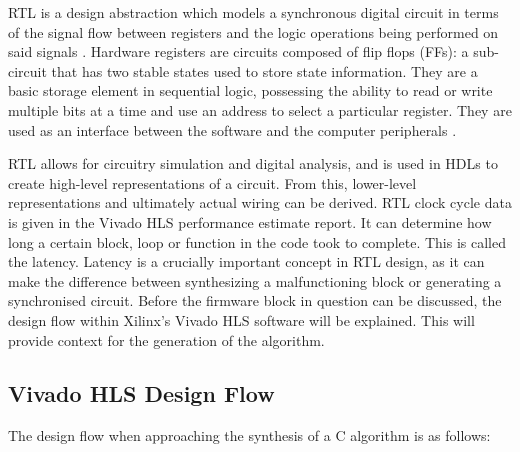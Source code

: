 \documentclass[10pt]{article}
\begin{document}
RTL is a design abstraction which models a synchronous digital circuit in terms of the signal flow between registers and the logic operations being performed on said signals \cite{vahid2010digital}. Hardware registers are circuits composed of flip flops (FFs): a sub-circuit that has two stable states used to store state information. They are a basic storage element in sequential logic, possessing the ability to read or write multiple bits at a time and use an address to select a particular register. They are used as an interface between the software and the computer peripherals \cite{bose1996hardware}.

RTL allows for circuitry simulation and digital analysis, and is used in HDLs to create high-level representations of a circuit. From this, lower-level representations and ultimately actual wiring can be derived. RTL clock cycle data is given in the Vivado HLS performance estimate report. It can determine how long a certain block, loop or function in the code took to complete. This is called the latency. Latency is a crucially important concept in RTL design, as it can make the difference between synthesizing a malfunctioning block or generating a synchronised circuit. Before the firmware block in question can be discussed, the design flow within Xilinx's Vivado HLS software will be explained. This will provide context for the generation of the algorithm.


\subsection{Vivado HLS Design Flow}
\label{section:HLS_DF}

The design flow when approaching the synthesis of a C algorithm is as follows:
\end{document}
